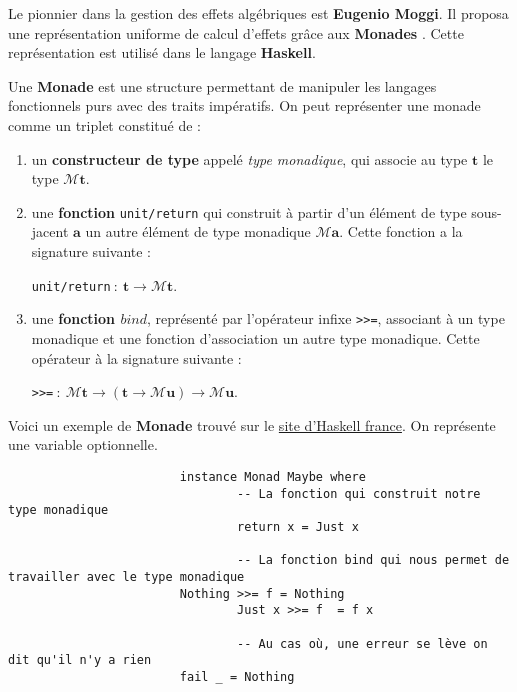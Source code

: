 	Le pionnier dans la gestion des effets algébriques est \textbf{Eugenio Moggi}. Il proposa une représentation uniforme de calcul d'effets grâce aux \textbf{Monades} \cite{DBLP:conf/ac/BentonHM00}. 
	Cette représentation est utilisé dans le langage \textbf{Haskell}.
	
	\begin{definition}
		Une \textbf{Monade} est une structure permettant de manipuler les langages fonctionnels purs
		avec des traits impératifs.
		On peut représenter une monade comme un triplet constitué de : 
		\begin{enumerate}
			\item un \textbf{constructeur de type} appelé \textit{type monadique}, qui associe au type $\textbf{t}$ le type $\mathcal{M}\textbf{t}$.
			\item une \textbf{fonction} \verb|unit/return| qui construit à partir d'un élément de type 
			sous-jacent $\textbf{a}$ un autre élément de type monadique $\mathcal{M}\textbf{a}$. Cette fonction a la signature suivante : 
			
			\verb|unit/return|$~:~\textbf{t} \rightarrow \mathcal{M}\textbf{t}$.
			\item une \textbf{fonction $bind$}, représenté par l'opérateur infixe \verb|>>=|, associant à un type monadique
			et une fonction d'association un autre type monadique. Cette opérateur à la signature suivante : 
			
			\verb|>>=|$~:~\mathcal{M}\textbf{t} \rightarrow (\textbf{t} \rightarrow \mathcal{M}\textbf{u}) \rightarrow \mathcal{M}\textbf{u}$.
		\end{enumerate}
	\end{definition}
	\bigbreak

	\begin{exemple} Voici un exemple de \textbf{Monade} trouvé sur le \href{http://lyah.haskell.fr/pour-une-poignee-de-monades}{site d'Haskell france}. On représente 
		une variable optionnelle.
		\begin{verbatim}
						instance Monad Maybe where
						        -- La fonction qui construit notre type monadique
						        return x = Just x
						
						        -- La fonction bind qui nous permet de travailler avec le type monadique
				        Nothing >>= f = Nothing
						        Just x >>= f  = f x
								
						        -- Au cas où, une erreur se lève on dit qu'il n'y a rien
				        fail _ = Nothing
		\end{verbatim}
	\end{exemple}
	\bigbreak
	

